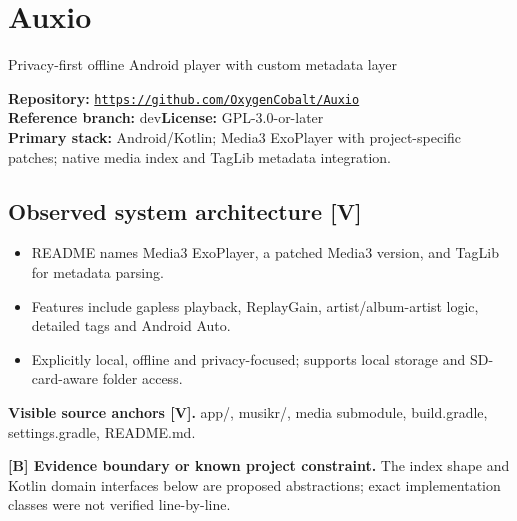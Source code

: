 \documentclass[10pt,a4paper,oneside]{report}
\newcommand{\tagboundary}{\textbf{[B] Evidence boundary or known project constraint.}}
\newcommand{\sourceurl}[1]{\href{#1}{\texttt{\nolinkurl{#1}}}}
\begin{document}
\chapter{Auxio}
{\large\color{muted}Privacy-first offline Android player with custom metadata layer}\par
\begin{evidencebox}\small\textbf{Repository:} \sourceurl{https://github.com/OxygenCobalt/Auxio}\\\textbf{Reference branch:} dev\qquad \textbf{License:} GPL-3.0-or-later\\\textbf{Primary stack:} Android/Kotlin; Media3 ExoPlayer with project-specific patches; native media index and TagLib metadata integration.\end{evidencebox}
\section{Observed system architecture [V]}
\begin{itemize}[leftmargin=*,itemsep=2pt,topsep=3pt]
\item README names Media3 ExoPlayer, a patched Media3 version, and TagLib for metadata parsing.
\item Features include gapless playback, ReplayGain, artist/album-artist logic, detailed tags and Android Auto.
\item Explicitly local, offline and privacy-focused; supports local storage and SD-card-aware folder access.
\end{itemize}
\textbf{Visible source anchors [V].} app/, musikr/, media submodule, build.gradle, settings.gradle, README.md.\par
\begin{evidencebox}\tagboundary{} The index shape and Kotlin domain interfaces below are proposed abstractions; exact implementation classes were not verified line-by-line.\end{evidencebox}
\end{document}
